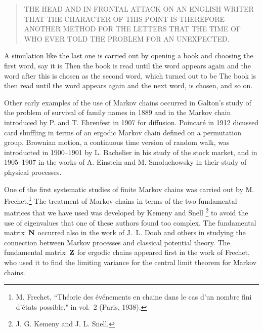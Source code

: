 \begin{quote}
THE HEAD AND IN FRONTAL ATTACK ON AN ENGLISH WRI\-TER THAT THE CHARACTER OF
THIS
POINT IS THEREFORE ANOTHER METHOD FOR THE LETTERS THAT THE TIME OF WHO EVER
TOLD THE PROBLEM FOR AN UNEXPECTED.
\end{quote}
\par
A simulation like the last one is carried out by opening a book and choosing
the first word, say it is   Then the book is read until the word
appears again and the word after this is chosen as the second word, which
turned out to be 
  The book is then read until the word  appears again
and the next
word,  is chosen, and so on.
\par
Other early examples of the use of Markov chains occurred in Galton's study of
the problem of survival of family names in 1889 and in the Markov chain
introduced by P. and T. Ehrenfest in 1907 for diffusion. 
Poincar\'{e} in 1912 dicussed card shuffling in terms of an ergodic Markov
chain defined 
on a permutation group.  Brownian motion, a continuous time version of random
walk, 
was introducted in 1900--1901 by L. Bachelier in his  study of the stock
market, 
and in 1905--1907 in the works of A. Einstein and M. Smoluchowsky in their
study of
physical processes.
\par
One of the first systematic studies of finite Markov chains was carried out by
M. Frechet.\footnote{M. Frechet, ``Th\'eorie des
\'ev\'enements en chaine dans
le cas d'un nombre fini d'\'etats possible," in  vol.~2 (Paris, 1938).}  The
treatment of Markov chains in terms of the two fundamental matrices that we
have used was developed by Kemeny and Snell
\footnote{J. G. Kemeny and J. L. Snell, } to avoid the use of eigenvalues that one of these
authors found too complex.  The fundamental matrix~${\mbox{\bf N}\/}$ occurred also in
the
work of J.~L. Doob and others in studying the connection between Markov
processes and classical potential theory.  The fundamental matrix~${\mbox{\bf Z}\/}$ for
ergodic chains appeared first in the work of Frechet, who used it to find the
limiting variance for the central limit theorem for Markov chains.

